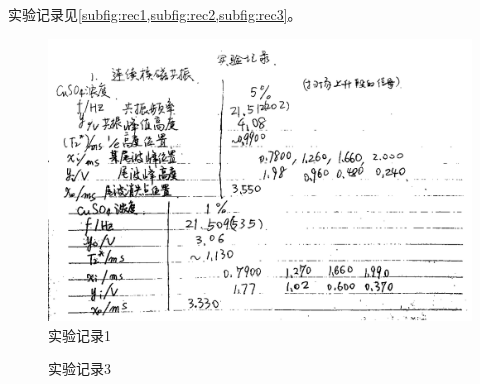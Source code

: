 实验记录见\cref{subfig:rec1,subfig:rec2,subfig:rec3}。
\begin{figure}[hbtp!]
		\centering\includegraphics[width=150mm]{./dat/recs/prc/1.png}
	\caption{实验记录1}\label{subfig:rec1}\end{figure}

	\begin{figure}[hbtp!]
\end{figure}
 
	\begin{figure}[hbtp!]
\caption{实验记录3}\label{subfig:rec3}
\end{figure}